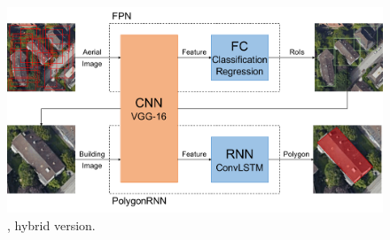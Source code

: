 \begin{figure}[!h]
	\centering
	\includegraphics[width=\fig\textwidth]{3-16.pdf}
    \caption[\modelnameshort, hybrid version]{\modelnameshort, hybrid version.}
    \label{fig:hybmod}
\end{figure}
